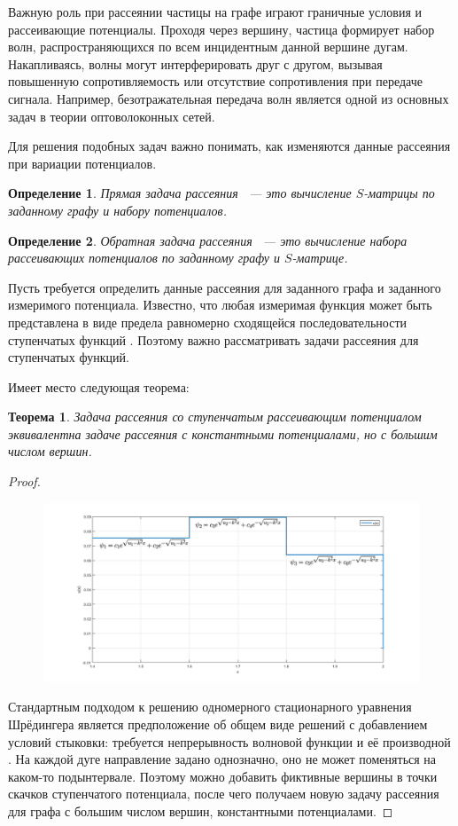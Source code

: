 \documentclass[a4 paper, 12 pt]{extarticle}
\newtheorem{theorem}{Теорема}[section]
\newtheorem{Def}{Определение}[section]
\begin{document}
   Важную роль при рассеянии частицы на графе играют граничные условия и рассеивающие потенциалы. Проходя через вершину, частица формирует набор волн, распространяющихся по всем инцидентным данной вершине дугам. Накапливаясь, волны могут интерферировать друг с другом, вызывая повышенную сопротивляемость или отсутствие сопротивления при передаче сигнала.
   Например, безотражательная передача волн является одной из основных задач в теории оптоволоконных сетей.
   
   Для решения подобных задач важно понимать, как изменяются данные рассеяния при вариации потенциалов.
   
   \begin{Def}
   	Прямая задача рассеяния ~--- это вычисление $S$-матрицы по заданному  графу и набору потенциалов.
   \end{Def}

   \begin{Def}
   	Обратная задача рассеяния ~--- это вычисление набора рассеивающих потенциалов по заданному графу и $S$-матрице.
   \end{Def}

   Пусть требуется определить данные рассеяния для заданного графа и заданного измеримого потенциала. Известно, что любая измеримая функция может быть представлена в виде предела равномерно сходящейся последовательности ступенчатых функций \cite{Kolmogorov}. Поэтому важно рассматривать задачи рассеяния для ступенчатых функций.
   
   Имеет место следующая теорема:
   \begin{theorem}
   	Задача рассеяния со ступенчатым рассеивающим потенциалом эквивалентна задаче рассеяния с константными потенциалами, но с большим числом вершин.
   \end{theorem}
   \begin{proof}
   	\begin{figure}[!htb]
   		\centering
   		\includegraphics[scale=0.5]{step.png}
   	\end{figure}
   	Стандартным подходом к решению одномерного стационарного уравнения Шрёдингера является предположение об общем виде решений с добавлением условий стыковки: требуется непрерывность волновой функции и её производной \cite{Peisakhovich}. На каждой дуге направление задано однозначно, оно не может поменяться на каком-то подынтервале. Поэтому можно добавить фиктивные вершины в точки скачков ступенчатого потенциала, после чего получаем новую задачу рассеяния для графа с большим числом вершин, константными потенциалами. 
   \end{proof}
      
\end{document}
